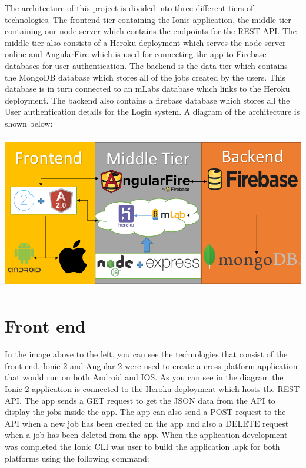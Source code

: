 The architecture of this project is divided into three different tiers of technologies. The frontend tier containing the Ionic application, the middle tier containing our node server which contains the endpoints for the REST API. The middle tier also consists of a Heroku deployment which serves the node server online and AngularFire which is used for connecting the app to Firebase databases for user authentication. The backend is the data tier which contains the MongoDB database which stores all of the jobs created by the users. This database is in turn connected to an mLabs database which links to the Heroku deployment. The backend also contains a firebase database which stores all the User authentication details for the Login system. A diagram of the architecture is shown below:


\begin{center}    
	\includegraphics[width=15cm, height=6.8cm]{img/system.png}
\end{center}







\section{Front end}
In the image above to the left, you can see the technologies that consist of the front end. Ionic 2 and  Angular 2 were used to create a cross-platform application that would run on both Android and IOS. As you can see in the diagram the Ionic 2 application is connected to the Heroku deployment which hosts the REST API. The app sends a GET request to get the JSON data from the API to display the jobs inside the app. The app can also send a POST request to the API when a new job has been created on the app and also a DELETE request when a job has been deleted from the app. When the application development was completed the Ionic CLI was user to build the application .apk for both platforms using the following command:

